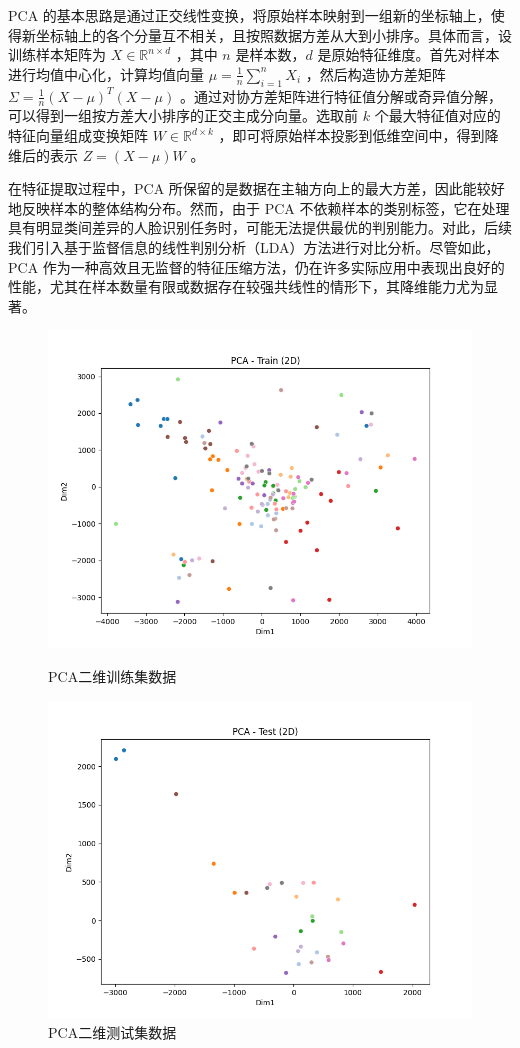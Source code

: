 \documentclass[a4paper, utf8]{ctexart}
\begin{document}
	PCA 的基本思路是通过正交线性变换，将原始样本映射到一组新的坐标轴上，使得新坐标轴上的各个分量互不相关，且按照数据方差从大到小排序。具体而言，设训练样本矩阵为 $X \in \mathbb{R}^{n \times d}$ ，其中 $n$ 是样本数，$d$ 是原始特征维度。首先对样本进行均值中心化，计算均值向量 $\mu = \frac{1}{n} \sum_{i=1}^n X_i$ ，然后构造协方差矩阵 $\Sigma = \frac{1}{n} (X-\mu)^T (X-\mu)$ 。通过对协方差矩阵进行特征值分解或奇异值分解，可以得到一组按方差大小排序的正交主成分向量。选取前 $k$ 个最大特征值对应的特征向量组成变换矩阵 $W \in \mathbb{R}^{d \times k}$ ，即可将原始样本投影到低维空间中，得到降维后的表示 $Z = (X-\mu)W$ 。
	
	在特征提取过程中，PCA 所保留的是数据在主轴方向上的最大方差，因此能较好地反映样本的整体结构分布。然而，由于 PCA 不依赖样本的类别标签，它在处理具有明显类间差异的人脸识别任务时，可能无法提供最优的判别能力。对此，后续我们引入基于监督信息的线性判别分析（LDA）方法进行对比分析\cite{pcavslda}。尽管如此，PCA 作为一种高效且无监督的特征压缩方法，仍在许多实际应用中表现出良好的性能，尤其在样本数量有限或数据存在较强共线性的情形下，其降维能力尤为显著。
	
	\begin{figure}[htbp]
		\centering
		\begin{minipage}{.45\textwidth}
			\centering
			\includegraphics[width=.8\textwidth]{./figure/PCAtrain.png}
			\caption{PCA二维训练集数据}
		\end{minipage}
		\begin{minipage}{.45\textwidth}
			\centering
			\includegraphics[width=.8\textwidth]{./figure/PCAtest.png}
			\caption{PCA二维测试集数据}
		\end{minipage}
	\end{figure}
	
\end{document}
